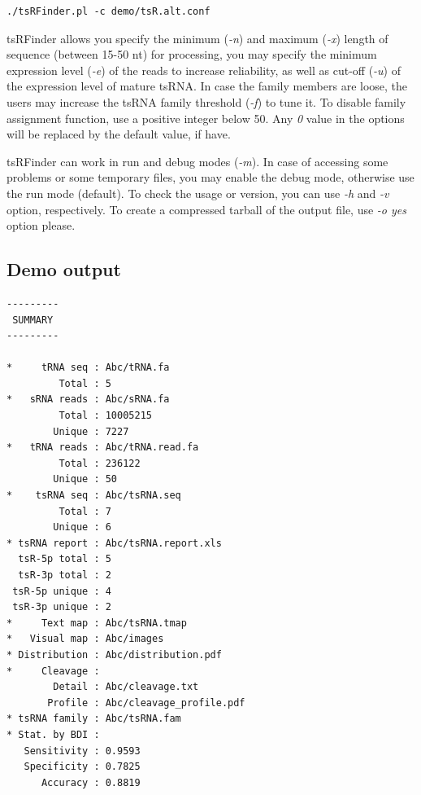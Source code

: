 \documentclass[11pt, a4paper]{article}
\begin{document}
{\footnotesize \begin{tcolorbox}[colback=blue!5!white,colframe=pink!75!black,title=Running tsRFinder alternative demo]
\begin{verbatim}
./tsRFinder.pl -c demo/tsR.alt.conf
\end{verbatim}
\end{tcolorbox}}

tsRFinder allows you specify the minimum (\emph{-n}) and maximum (\emph{-x}) length of sequence (between 15-50 nt) for processing, you may specify the minimum expression level (\emph{-e}) of the reads to increase reliability, as well as cut-off (\emph{-u}) of the expression level of mature tsRNA. In case the family members are loose, the users may increase the tsRNA family threshold (\emph{-f}) to tune it. To disable family assignment function, use a positive integer below 50. Any \emph{0} value in the options will be replaced by the default value, if have.

tsRFinder can work in run and debug modes (\emph{-m}). In case of accessing some problems or some temporary files, you may enable the debug mode, otherwise use the run mode (default). To check the usage or version, you can use \emph{-h} and \emph{-v} option, respectively. To create a compressed tarball of the output file, use \emph{-o yes} option please.

\subsection{Demo output}

{\footnotesize \begin{tcolorbox}[colback=blue!5!white,colframe=pink!75!black,title=tsRFinder demo output list]
\begin{verbatim}
---------
 SUMMARY 
---------

*     tRNA seq : Abc/tRNA.fa
         Total : 5
*   sRNA reads : Abc/sRNA.fa
         Total : 10005215
        Unique : 7227
*   tRNA reads : Abc/tRNA.read.fa
         Total : 236122
        Unique : 50
*    tsRNA seq : Abc/tsRNA.seq
         Total : 7
        Unique : 6
* tsRNA report : Abc/tsRNA.report.xls
  tsR-5p total : 5
  tsR-3p total : 2
 tsR-5p unique : 4
 tsR-3p unique : 2
*     Text map : Abc/tsRNA.tmap
*   Visual map : Abc/images
* Distribution : Abc/distribution.pdf
*     Cleavage :
        Detail : Abc/cleavage.txt
       Profile : Abc/cleavage_profile.pdf
* tsRNA family : Abc/tsRNA.fam
* Stat. by BDI :
   Sensitivity : 0.9593
   Specificity : 0.7825
      Accuracy : 0.8819
\end{verbatim}
\end{tcolorbox}}
\end{document}
